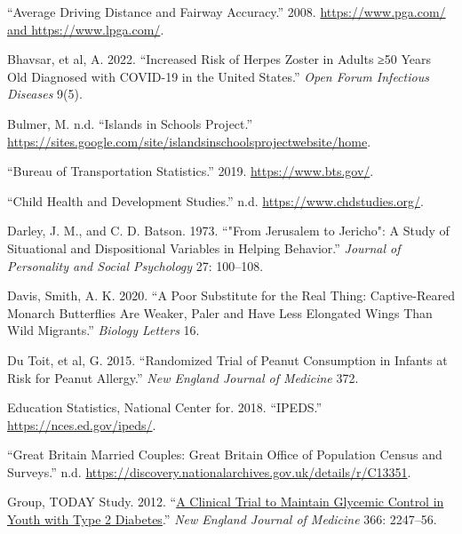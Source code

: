 \documentclass[
]{report}
\newlength{\cslhangindent}
\newlength{\cslentryspacingunit} %
\newenvironment{CSLReferences}[2] %
 {%
  \setlength{\parindent}{0pt}
  \ifodd #1
  \let\oldpar\par
  \def\par{\hangindent=\cslhangindent\oldpar}
  \fi
  \setlength{\parskip}{#2\cslentryspacingunit}
 }%
 {}
\begin{document}
\hypertarget{refs}{}
\begin{CSLReferences}{1}{0}
\leavevmode{}%
{``Average Driving Distance and Fairway Accuracy.''} 2008. \href{https://www.pga.com/\%20and\%20https://www.lpga.com/}{https://www.pga.com/ and https://www.lpga.com/}.

\leavevmode{}%
Bhavsar, et al, A. 2022. {``Increased Risk of Herpes Zoster in Adults ≥50 Years Old Diagnosed with COVID-19 in the United States.''} \emph{Open Forum Infectious Diseases} 9(5).

\leavevmode{}%
Bulmer, M. n.d. {``Islands in Schools Project.''} \url{https://sites.google.com/site/islandsinschoolsprojectwebsite/home}.

\leavevmode{}%
{``Bureau of Transportation Statistics.''} 2019. \url{https://www.bts.gov/}.

\leavevmode{}%
{``Child Health and Development Studies.''} n.d. \url{https://www.chdstudies.org/}.

\leavevmode{}%
Darley, J. M., and C. D. Batson. 1973. {``"From Jerusalem to Jericho": A Study of Situational and Dispositional Variables in Helping Behavior.''} \emph{Journal of Personality and Social Psychology} 27: 100--108.

\leavevmode{}%
Davis, Smith, A. K. 2020. {``A Poor Substitute for the Real Thing: Captive-Reared Monarch Butterflies Are Weaker, Paler and Have Less Elongated Wings Than Wild Migrants.''} \emph{Biology Letters} 16.

\leavevmode{}%
Du Toit, et al, G. 2015. {``Randomized Trial of Peanut Consumption in Infants at Risk for Peanut Allergy.''} \emph{New England Journal of Medicine} 372.

\leavevmode{}%
Education Statistics, National Center for. 2018. {``IPEDS.''} \url{https://nces.ed.gov/ipeds/}.

\leavevmode{}%
{``Great Britain Married Couples: Great Britain Office of Population Census and Surveys.''} n.d. \url{https://discovery.nationalarchives.gov.uk/details/r/C13351}.

\leavevmode{}%
Group, TODAY Study. 2012. {``\href{https://www.ncbi.nlm.nih.gov/pubmed/22540912}{A Clinical Trial to Maintain Glycemic Control in Youth with Type 2 Diabetes}.''} \emph{New England Journal of Medicine} 366: 2247--56.


\end{CSLReferences}
\end{document}
